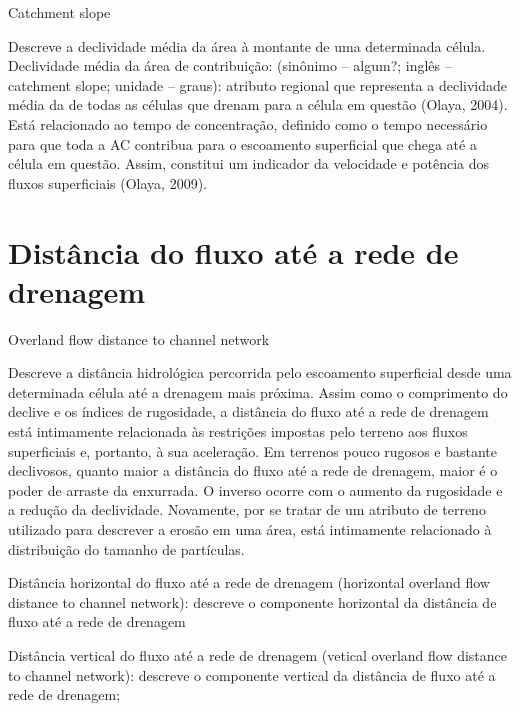 \documentclass[]{book}
\begin{document}
Catchment slope

Descreve a declividade média da área à montante de uma determinada
célula. Declividade média da área de contribuição: (sinônimo -- algum?;
inglês -- catchment slope; unidade -- graus): atributo regional que
representa a declividade média da de todas as células que drenam para a
célula em questão (Olaya, 2004). Está relacionado ao tempo de
concentração, definido como o tempo necessário para que toda a AC
contribua para o escoamento superficial que chega até a célula em
questão. Assim, constitui um indicador da velocidade e potência dos
fluxos superficiais (Olaya, 2009).

\section{Distância do fluxo até a rede de
drenagem}\label{distancia-do-fluxo-ate-a-rede-de-drenagem}

Overland flow distance to channel network

Descreve a distância hidrológica percorrida pelo escoamento superficial
desde uma determinada célula até a drenagem mais próxima. Assim como o
comprimento do declive e os índices de rugosidade, a distância do fluxo
até a rede de drenagem está intimamente relacionada às restrições
impostas pelo terreno aos fluxos superficiais e, portanto, à sua
aceleração. Em terrenos pouco rugosos e bastante declivosos, quanto
maior a distância do fluxo até a rede de drenagem, maior é o poder de
arraste da enxurrada. O inverso ocorre com o aumento da rugosidade e a
redução da declividade. Novamente, por se tratar de um atributo de
terreno utilizado para descrever a erosão em uma área, está intimamente
relacionado à distribuição do tamanho de partículas.

Distância horizontal do ﬂuxo até a rede de drenagem (horizontal overland
ﬂow distance to channel network): descreve o componente horizontal da
distância de ﬂuxo até a rede de drenagem

Distância vertical do ﬂuxo até a rede de drenagem (vetical overland ﬂow
distance to channel network): descreve o componente vertical da
distância de ﬂuxo até a rede de drenagem;
\end{document}
